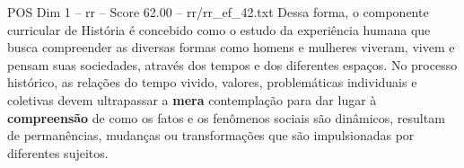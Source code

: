 \begin{textsample}{POS Dim 1 – rr – Score 62.00 – rr/rr\_ef\_42.txt}
Dessa forma, o componente curricular de História é concebido como o estudo da experiência humana que busca compreender as diversas formas como homens e mulheres viveram, vivem e pensam suas sociedades, através dos tempos e dos diferentes espaços.
No processo histórico, as relações do tempo vivido, valores, problemáticas individuais e coletivas devem ultrapassar a \textbf{mera} contemplação para dar lugar à \textbf{compreensão} de como os fatos e os fenômenos sociais são dinâmicos, resultam de permanências, mudanças ou transformações que são impulsionadas por diferentes sujeitos.

\end{textsample}
